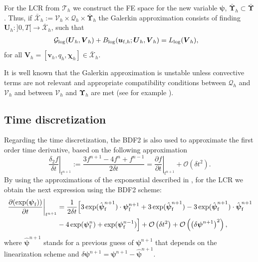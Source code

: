 \documentclass[11pt,english]{article}
\def\ufluidh{\boldsymbol{u}_{{\rm{f}},h}}
\def\psifluid{\boldsymbol{\psi}_{\rm{f}}}
\def\psifluidhat{\hat{\boldsymbol{\psi}}_{\rm{f}}}
\begin{document}
For the LCR from $\mathcal{T}_{h}$ we construct the FE space for
the new variable $\boldsymbol{\psi}$, $\bar{\boldsymbol{\Upsilon}}_{h}\subset\bar{\boldsymbol{\Upsilon}}$.
Thus, if $\boldsymbol{\bar{\mathcal{X}}}_{h}:=\boldsymbol{\mathcal{V}}_{h}\times\mathcal{Q}_{h}\times\bar{\boldsymbol{\Upsilon}}_{h}$
the Galerkin approximation consists of finding $\boldsymbol{U}_{h}:]0,T[\longrightarrow\bar{\boldsymbol{\mathcal{X}}}_{h}$, such that 
\begin{align*}
    \mathcal{G}_{\text{log}}(\boldsymbol{U}_{h},\boldsymbol{V}_{h})+B_{\text{log}}(\ufluidh;\boldsymbol{U}_{h},\boldsymbol{V}_{h}) & =L_{\log}(\boldsymbol{V}_{h}),
\end{align*}
for all $\boldsymbol{V}_{h}=[\boldsymbol{v}_{h},q_{h},\boldsymbol{\boldsymbol{\chi}}_{h}]\in\boldsymbol{\bar{\mathcal{X}}}_{h}$.

It is well known that the Galerkin approximation is unstable unless convective terms are not relevant and appropriate compatibility conditions between $\mathcal{Q}_{h}$ and $\boldsymbol{\mathcal{V}}_{h}$ and between $\boldsymbol{\mathcal{V}}_{h}$ and $\boldsymbol{\Upsilon}_{h}$ are met (see for example \cite{castillo2014}).

\subsection{Time discretization}

Regarding the time discretization, the BDF2 is also used to approximate the first order time derivative, based on the following approximation
\[
 \left.\frac{\delta_2 f}{\delta t}\right\vert _{t^{n+1}} :=\frac{3f^{n+1}-4f^{n}+f^{n-1}}{2\delta t} =
    \left.\frac{\partial f}{\partial t}\right\vert _{t^{n+1}} +\mathcal{O}(\delta t^{2}).
\]
By using the approximations of the exponential described in \cite{moreno2019logarithmic}, for the LCR we obtain the next expression using the BDF2 scheme: 
\begin{align*}
    \left.\frac{\partial(\exp(\psifluid))}{\partial t}\right\vert _{t^{n+1}} & =\frac{\text{1}}{2\delta t}\Bigl[3\exp(\psifluidhat^{n+1})\cdot\psifluid^{n+1}+3\exp(\psifluidhat^{n+\text{1}})-3\exp(\psifluidhat^{n+1})\cdot\psifluidhat^{n+1}\\
     & -4\exp(\psifluid^{n})+\exp(\psifluid^{n-1})\Bigr]+\mathcal{O}\left(\delta t^2\right)+\mathcal{O}\left(\left(\delta\boldsymbol{\psi}^{n+1}\right)^{2}\right),
\end{align*}
where $\boldsymbol{\hat{\psi}}^{n+1}$ stands for a previous guess
of $\boldsymbol{\psi}^{n+1}$ that depends on the linearization scheme
and $\delta\boldsymbol{\psi}^{n+1}=\boldsymbol{\psi}^{n+1}-\boldsymbol{\hat{\psi}}^{n+1}$. 
\end{document}
